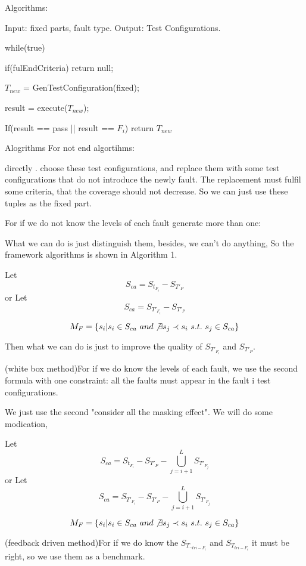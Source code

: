\documentclass{sig-alternate}
\begin{document}
Algorithms:

Input: fixed parts, fault type.
Output: Test Configurations.


while(true){
  if(fulEndCriteria)
    return null;
  
  $T_{new}$ = GenTestConfiguration(fixed);
  
  result = execute($T_{new}$);
  
  If(result == pass || result == $F_{i}$)
     return $T_{new}$
     
 }


Alogrithms For not end algortihms:

directly . choose these test configurations, and replace them with some test configurations that do not introduce the newly fault. The replacement must fulfil some criteria, that the coverage should not decrease. So we can just use these tuples as the fixed part.




For if we do not know the levels of each fault generate more than one:

What we can do is just distinguish them, besides, we can't do anything, So the framework algorithms is shown in Algorithm 1.

Let $$S_{ca} = S_{t_{F_{i}}} - S_{T'_{P}}$$  or Let $$S_{ca} = S_{T'_{F_{i}}} - S_{T'_{P}}$$

$$M_{F} = \{s_{i} | s_{i} \in S_{ca}\ and \not\exists s_{j} \prec s_{i}\ s.t.\ s_{j} \in S_{ca} \}$$

Then what we can do is just to improve the quality of $ S_{T'_{F_{i}}} $ and $ S_{T'_{P}} $.






(white box method)For if we do know the levels of each fault, we use the second formula with one constraint: all the faults must appear in the fault i test configurations.

We just use the second "consider all the masking effect". We will do some modication,

Let $$S_{ca} = S_{t_{F_{i}}} - S_{T'_{P}} - \bigcup_{j = i+1}^{L}S_{T'_{F_{j}}}$$  or Let $$S_{ca} = S_{T'_{F_{i}}} - S_{T'_{P}} - \bigcup_{j = i+1}^{L}S_{T'_{F_{j}}}$$


$$M_{F} = \{s_{i} | s_{i} \in S_{ca}\ and \not\exists s_{j} \prec s_{i}\ s.t.\ s_{j} \in S_{ca} \}$$



(feedback driven method)For if we do know the $S_{T_{\neg tri-F_{i}}}$ and $S_{T_{tri-F_{i}}}$ it must be right, so we use them as a benchmark.
\end{document}
